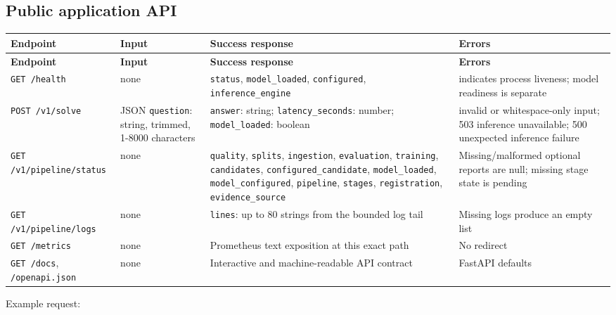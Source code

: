 \documentclass[11pt,a4paper]{article}
\begin{document}
\subsection*{Public application API}
\begingroup\small
\begin{longtable}{@{}>{\raggedright\arraybackslash}p{0.2500\dimexpr\textwidth-36pt\relax}>{\raggedright\arraybackslash}p{0.2500\dimexpr\textwidth-36pt\relax}>{\raggedright\arraybackslash}p{0.2500\dimexpr\textwidth-36pt\relax}>{\raggedright\arraybackslash}p{0.2500\dimexpr\textwidth-36pt\relax}@{}}
\toprule
\textbf{Endpoint} & \textbf{Input} & \textbf{Success response} & \textbf{Errors} \\
\midrule
\endfirsthead
\textbf{Endpoint} & \textbf{Input} & \textbf{Success response} & \textbf{Errors} \\
\midrule
\endhead
\texttt{GET /\allowbreak{}health} & none & \texttt{status}, \texttt{model\_\allowbreak{}loaded}, \texttt{configured}, \texttt{inference\_\allowbreak{}engine} & 200 indicates process liveness; model readiness is separate \\
\texttt{POST /\allowbreak{}v1/\allowbreak{}solve} & JSON \texttt{question}: string, trimmed, 1-8000 characters & \texttt{answer}: string; \texttt{latency\_\allowbreak{}seconds}: number; \texttt{model\_\allowbreak{}loaded}: boolean & 422 invalid or whitespace-only input; 503 inference unavailable; 500 unexpected inference failure \\
\texttt{GET /\allowbreak{}v1/\allowbreak{}pipeline/\allowbreak{}status} & none & \texttt{quality}, \texttt{splits}, \texttt{ingestion}, \texttt{evaluation}, \texttt{training}, \texttt{candidates}, \texttt{configured\_\allowbreak{}candidate}, \texttt{model\_\allowbreak{}loaded}, \texttt{model\_\allowbreak{}configured}, \texttt{pipeline}, \texttt{stages}, \texttt{registration}, \texttt{evidence\_\allowbreak{}source} & Missing/malformed optional reports are null; missing stage state is pending \\
\texttt{GET /\allowbreak{}v1/\allowbreak{}pipeline/\allowbreak{}logs} & none & \texttt{lines}: up to 80 strings from the bounded log tail & Missing logs produce an empty list \\
\texttt{GET /\allowbreak{}metrics} & none & Prometheus text exposition at this exact path & No redirect \\
\texttt{GET /\allowbreak{}docs}, \texttt{/\allowbreak{}openapi.\allowbreak{}json} & none & Interactive and machine-readable API contract & FastAPI defaults \\
\bottomrule
\end{longtable}
\endgroup
Example request:
\end{document}
